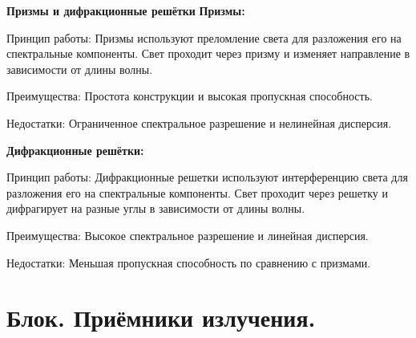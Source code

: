 \documentclass[12pt]{article}
\begin{document}
\textbf{Призмы и дифракционные решётки}
\textbf{Призмы:}

Принцип работы: Призмы используют преломление света для разложения его на спектральные компоненты. Свет проходит через призму и изменяет направление в зависимости от длины волны.

Преимущества: Простота конструкции и высокая пропускная способность.

Недостатки: Ограниченное спектральное разрешение и нелинейная дисперсия.

\textbf{Дифракционные решётки:}

Принцип работы: Дифракционные решетки используют интерференцию света для разложения его на спектральные компоненты. Свет проходит через решетку и дифрагирует на разные углы в зависимости от длины волны.

Преимущества: Высокое спектральное разрешение и линейная дисперсия.

Недостатки: Меньшая пропускная способность по сравнению с призмами.
	\section{Блок. Приёмники излучения.}
\end{document}

